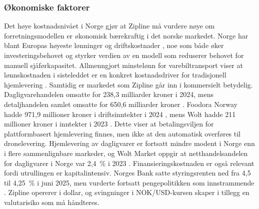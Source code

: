 \subsubsection{Økonomiske faktorer}
Det høye kostnadsnivået i Norge gjør at Zipline må vurdere nøye om
forretningsmodellen er økonomisk bærekraftig i det norske markedet. Norge har
blant Europas høyeste lønninger og driftskostnader \parencite{ssb2024}, noe
som både øker investeringsbehovet og styrker verdien av en modell som
reduserer behovet for manuell sjåførkapasitet. Allmenngjort minstelønn for
varebiltransport viser at lønnskostnaden i sisteleddet er en konkret
kostnadsdriver for tradisjonell hjemlevering \parencite{nholt2025_varebil}.
Samtidig er markedet som Zipline går inn i kommersielt betydelig.
Dagligvarehandelen omsatte for 238{,}3 milliarder kroner i 2024, mens
detaljhandelen samlet omsatte for 650{,}6 milliarder kroner
\parencite{ssb2025_detaljhandel}. Foodora Norway hadde 971{,}9 millioner
kroner i driftsinntekter i 2024 \parencite{purehelp2025_foodora}, mens Wolt
hadde 211 millioner kroner i inntekter i 2023 \parencite{wolt2024_e24}. Dette
viser at betalingsviljen for plattformbasert hjemlevering finnes, men ikke at
den automatisk overføres til dronelevering. Hjemlevering av dagligvarer er
fortsatt mindre modent i Norge enn i flere sammenlignbare markeder, og Wolt
Market oppgir at netthandelsandelen for dagligvarer i Norge var 2{,}4~\% i
2023 \parencite{retailmagasinet2025_woltmarket}. Finansieringskostnaden er
også relevant fordi utrullingen er kapitalintensiv. Norges Bank satte
styringsrenten ned fra 4{,}5 til 4{,}25~\% i juni 2025, men vurderte fortsatt
pengepolitikken som innstrammende \parencite{norgesbank2025_rente}. Zipline
opererer i dollar, og svingninger i NOK/USD-kursen skaper i tillegg en
valutarisiko som må håndteres.

